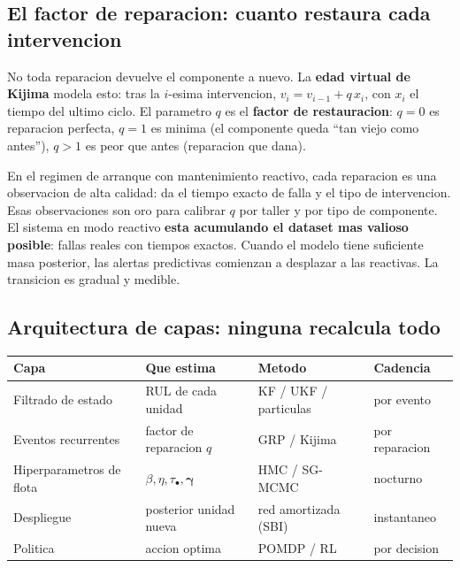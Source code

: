 \documentclass[10.5pt,a4paper]{article}
\begin{document}
\subsection{El factor de reparacion: cuanto restaura cada intervencion}

No toda reparacion devuelve el componente a nuevo. La \textbf{edad virtual de
Kijima} modela esto: tras la $i$-esima intervencion,
$v_i = v_{i-1} + q\,x_i$, con $x_i$ el tiempo del ultimo ciclo. El parametro $q$
es el \textbf{factor de restauracion}: $q=0$ es reparacion perfecta,
$q=1$ es minima (el componente queda ``tan viejo como antes''),
$q>1$ es peor que antes (reparacion que dana).

\begin{notebox}
En el regimen de arranque con mantenimiento reactivo, cada reparacion es
una observacion de alta calidad: da el tiempo exacto de falla y el tipo de
intervencion. Esas observaciones son oro para calibrar $q$ por taller y por
tipo de componente. El sistema en modo reactivo \textbf{esta acumulando el
dataset mas valioso posible}: fallas reales con tiempos exactos. Cuando el
modelo tiene suficiente masa posterior, las alertas predictivas comienzan a
desplazar a las reactivas. La transicion es gradual y medible.
\end{notebox}

\subsection{Arquitectura de capas: ninguna recalcula todo}

\begin{center}
\small
\begin{tabular}{@{}p{3.6cm}p{3.5cm}p{3.5cm}p{2.2cm}@{}}
\toprule
\textbf{Capa} & \textbf{Que estima} & \textbf{Metodo} & \textbf{Cadencia} \\
\midrule
Filtrado de estado & RUL de cada unidad & KF / UKF / particulas & por evento \\
Eventos recurrentes & factor de reparacion $q$ & GRP / Kijima & por reparacion \\
Hiperparametros de flota & $\beta,\eta,\tau_\bullet,\boldsymbol\gamma$ & HMC / SG-MCMC & nocturno \\
Despliegue & posterior unidad nueva & red amortizada (SBI) & instantaneo \\
Politica & accion optima & POMDP / RL & por decision \\
\bottomrule
\end{tabular}
\end{center}
\end{document}

